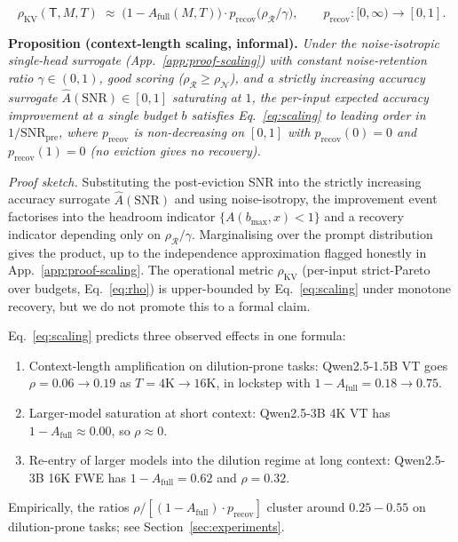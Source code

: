 \documentclass{article}
\begin{document}
\begin{equation}
\label{eq:scaling}
\rho_{\mathrm{KV}}(\mathsf{T}, M, T) \;\approx\;
\bigl(1 - A_{\mathrm{full}}(M, T)\bigr) \cdot p_{\mathrm{recov}}\bigl(\rho_{\mathcal{R}} / \gamma\bigr),
\qquad p_{\mathrm{recov}}: [0, \infty) \to [0, 1].
\end{equation}

\textbf{Proposition (context-length scaling, informal).} \emph{Under the
noise-isotropic single-head surrogate (App.~\ref{app:proof-scaling}) with
constant noise-retention ratio $\gamma \in (0, 1)$, good scoring
($\rho_{\mathcal{R}} \ge \rho_{\mathcal{N}}$), and a strictly increasing
accuracy surrogate $\hat A(\mathrm{SNR}) \in [0, 1]$ saturating at $1$, the
per-input expected accuracy improvement at a single budget $b$ satisfies
Eq.~\eqref{eq:scaling} to leading order in $1/\mathrm{SNR}_{\mathrm{pre}}$,
where $p_{\mathrm{recov}}$ is non-decreasing on $[0, 1]$ with
$p_{\mathrm{recov}}(0) = 0$ and $p_{\mathrm{recov}}(1) = 0$ (no eviction
gives no recovery).}

\emph{Proof sketch.} Substituting the post-eviction SNR into the strictly
increasing accuracy surrogate $\hat A(\mathrm{SNR})$ and using
noise-isotropy, the improvement event factorises into the headroom
indicator $\{A(b_{\max}, x) < 1\}$ and a recovery indicator depending only
on $\rho_{\mathcal{R}} / \gamma$. Marginalising over the prompt
distribution gives the product, up to the independence approximation
flagged honestly in App.~\ref{app:proof-scaling}. The operational metric
$\rho_{\mathrm{KV}}$ (per-input strict-Pareto over budgets,
Eq.~\eqref{eq:rho}) is upper-bounded by Eq.~\eqref{eq:scaling} under
monotone recovery, but we do not promote this to a formal claim.

Eq.~\eqref{eq:scaling} predicts three observed effects in one formula:
\begin{enumerate}
\item Context-length amplification on dilution-prone tasks: Qwen2.5-1.5B
VT goes $\rho = 0.06 \to 0.19$ as $T = 4\mathrm{K} \to 16\mathrm{K}$, in
lockstep with $1 - A_{\mathrm{full}} = 0.18 \to 0.75$.
\item Larger-model saturation at short context: Qwen2.5-3B 4K VT has
$1 - A_{\mathrm{full}} \approx 0.00$, so $\rho \approx 0$.
\item Re-entry of larger models into the dilution regime at long
context: Qwen2.5-3B 16K FWE has $1 - A_{\mathrm{full}} = 0.62$ and
$\rho = 0.32$.
\end{enumerate}
Empirically, the ratios $\rho / [(1-A_{\mathrm{full}}) \cdot p_{\mathrm{recov}}]$
cluster around $0.25 - 0.55$ on dilution-prone tasks; see
Section~\ref{sec:experiments}.
\end{document}
